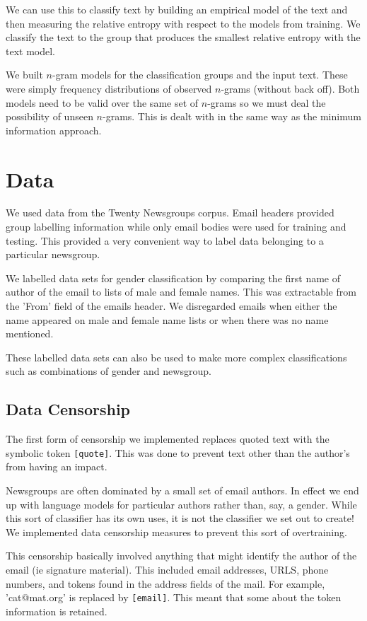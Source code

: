 \documentclass[a4]{article}
\begin{document}
We can use this to classify text by building an empirical model of
the text and then measuring the relative entropy with respect to 
the models from training. We classify the text to the group that
produces the smallest relative entropy with the text model.       

We built $n$-gram models for the classification groups and the input text.
These were simply frequency distributions of observed $n$-grams (without back
off). Both models need to be valid over the same set of $n$-grams so we must
deal the possibility of unseen $n$-grams.  This is dealt with in the same way
as the minimum information approach.     
 
\section{Data}
We used data from the Twenty Newsgroups corpus. Email headers provided group
labelling information while only email bodies were used for training and
testing.  This provided a very convenient way to label data belonging to a
particular newsgroup. 

We labelled data sets for gender classification by comparing the first name of
author of the email to lists of male and female names.  This was extractable
from the 'From' field of the emails header.  We disregarded emails when either
the name appeared on male and female name lists or when there was no name
mentioned.

These labelled data sets can also be used to make more complex classifications
such as combinations of gender and newsgroup.

\subsection{Data Censorship} 

The first form of censorship we implemented replaces quoted text with 
the symbolic token \texttt{[quote]}. This was done to prevent text other
than the author's from having an impact.

Newsgroups are often dominated by a small set of email
authors.  In effect we end up with language models for particular authors
rather than, say, a gender.  While this sort of classifier has its own uses, it
is not the classifier we set out to create! We implemented 
data censorship measures to prevent this sort of overtraining.

This censorship basically involved anything that might identify the author of
the email (ie signature material). This included  email addresses, URLS, phone
numbers, and tokens found in the address fields of the mail.  For example,
'cat@mat.org' is replaced by \texttt{[email]}. This meant that some about the
token information is retained. 
\end{document}
